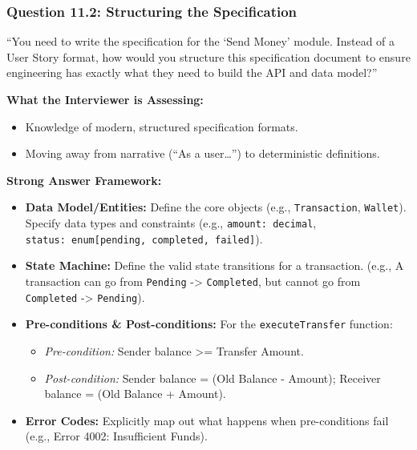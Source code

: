 \subsubsection{Question 11.2: Structuring the
Specification}\label{question-11.2-structuring-the-specification}

``You need to write the specification for the `Send Money' module.
Instead of a User Story format, how would you structure this
specification document to ensure engineering has exactly what they need
to build the API and data model?''

\textbf{What the Interviewer is Assessing:}

\begin{itemize}
\tightlist
\item
  Knowledge of modern, structured specification formats.
\item
  Moving away from narrative (``As a user\ldots{}'') to deterministic
  definitions.
\end{itemize}

\textbf{Strong Answer Framework:}

\begin{itemize}
\tightlist
\item
  \textbf{Data Model/Entities:} Define the core objects (e.g.,
  \texttt{Transaction}, \texttt{Wallet}). Specify data types and
  constraints (e.g., \texttt{amount:\ decimal},
  \texttt{status:\ enum{[}pending,\ completed,\ failed{]}}).
\item
  \textbf{State Machine:} Define the valid state transitions for a
  transaction. (e.g., A transaction can go from \texttt{Pending}
  -\textgreater{} \texttt{Completed}, but cannot go from
  \texttt{Completed} -\textgreater{} \texttt{Pending}).
\item
  \textbf{Pre-conditions \& Post-conditions:} For the
  \texttt{executeTransfer} function:

  \begin{itemize}
  \tightlist
  \item
    \emph{Pre-condition:} Sender balance \textgreater= Transfer Amount.
  \item
    \emph{Post-condition:} Sender balance = (Old Balance - Amount);
    Receiver balance = (Old Balance + Amount).
  \end{itemize}
\item
  \textbf{Error Codes:} Explicitly map out what happens when
  pre-conditions fail (e.g., Error 4002: Insufficient Funds).
\end{itemize}

